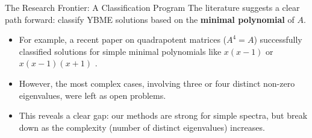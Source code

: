 \documentclass{beamer}
\begin{document}

\begin{frame}{The Research Frontier: A Classification Program}
  The literature suggests a clear path forward: classify YBME solutions based on the \textbf{minimal polynomial} of $A$.
  \begin{itemize}
    \item For example, a recent paper on quadrapotent matrices ($A^4=A$) successfully classified solutions for simple minimal polynomials like $x(x-1)$ or $x(x-1)(x+1)$ \cite{quadrapotent}.
    \pause
    \item However, the most complex cases, involving three or four distinct non-zero eigenvalues, were left as open problems.
    \pause
    \item This reveals a clear gap: our methods are strong for simple spectra, but break down as the complexity (number of distinct eigenvalues) increases.
  \end{itemize}
\end{frame}
\end{document}
